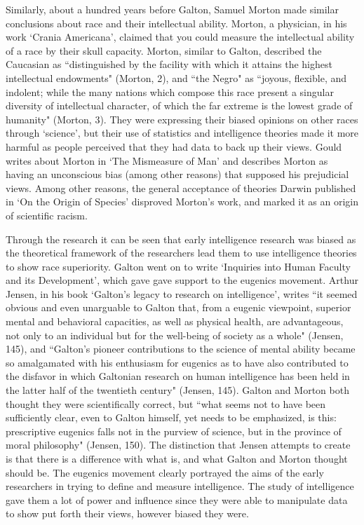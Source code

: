 \documentclass[12pt, oneside]{article}
\begin{document}
\par Similarly, about a hundred years before Galton, Samuel Morton made similar conclusions about race and their intellectual ability. Morton, a physician, in his work `Crania Americana', claimed that you could measure the intellectual ability of a race by their skull capacity. Morton, similar to Galton, described the Caucasian as ``distinguished by the facility with which it attains the highest intellectual endowments" (Morton, 2), and ``the Negro" as ``joyous, flexible, and indolent; while the many nations which compose this race present a singular diversity of intellectual character, of which the far extreme is the lowest grade of humanity" (Morton, 3). They were expressing their biased opinions on other races through `science', but their use of statistics and intelligence theories made it more harmful as people perceived that they had data to back up their views. Gould writes about Morton in `The Mismeasure of Man' and describes Morton as having an unconscious bias (among other reasons) that supposed his prejudicial views. Among other reasons, the general acceptance of theories Darwin published in `On the Origin of Species' disproved Morton's work, and marked it as an origin of scientific racism.

\par Through the research it can be seen that early intelligence research was biased as the theoretical framework of the researchers lead them to use intelligence theories to show race superiority. Galton went on to write `Inquiries into Human Faculty and its Development', which gave gave support to the eugenics movement. Arthur Jensen, in his book `Galton's legacy to research on intelligence', writes ``it seemed obvious and even unarguable to Galton that, from a eugenic viewpoint, superior mental and behavioral capacities, as well as physical health, are advantageous, not only to an individual but for the well-being of society as a whole" (Jensen, 145), and ``Galton's pioneer contributions to the science of mental ability became so amalgamated with his enthusiasm for eugenics as to have also contributed to the disfavor in which Galtonian research on human intelligence has been held in the latter half of the twentieth century" (Jensen, 145). Galton and Morton both thought they were scientifically correct, but ``what seems not to have been sufficiently clear, even to Galton himself, yet needs to be emphasized, is this: prescriptive eugenics falls not in the purview of science, but in the province of moral philosophy" (Jensen, 150). The distinction that Jensen attempts to create is that there is a difference with what is, and what Galton and Morton thought should be. The eugenics movement clearly portrayed the aims of the early researchers in trying to define and measure intelligence. The study of intelligence gave them a lot of power and influence since they were able to manipulate data to show put forth their views, however biased they were.
\end{document}
